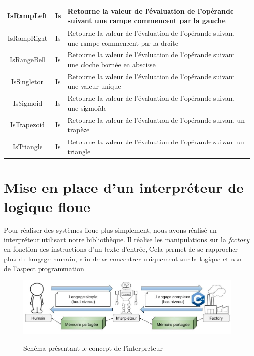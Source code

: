 \documentclass[a4paper,11pt]{article}
\begin{document}
\begin{table}[H]
\begin{center}
\begin{tabular}{|c|c|M{9cm}|}
                \hline
                IsRampLeft & Is & Retourne la valeur de l'évaluation de l'opérande suivant une rampe commencent par la gauche \tabularnewline
                \hline
                IsRampRight & Is & Retourne la valeur de l'évaluation de l'opérande suivant une rampe commencent par la droite \tabularnewline
                \hline
                IsRangeBell & Is & Retourne la valeur de l'évaluation de l'opérande suivant une cloche bornée en abscisse \tabularnewline
                \hline
                IsSingleton & Is & Retourne la valeur de l'évaluation de l'opérande suivant une valeur unique \tabularnewline
                \hline
                IsSigmoid & Is & Retourne la valeur de l'évaluation de l'opérande suivant une sigmoïde \tabularnewline
                \hline
                IsTrapezoid & Is & Retourne la valeur de l'évaluation de l'opérande suivant un trapèze \tabularnewline
                \hline
                IsTriangle & Is & Retourne la valeur de l'évaluation de l'opérande suivant un triangle \tabularnewline
                \hline
            \end{tabular}
        \end{center}
    \end{table}

    \newpage
    \section{Mise en place d'un interpréteur de logique floue}

    Pour réaliser des systèmes floue plus simplement, nous avons réalisé un interpréteur utilisant notre bibliothèque.
    Il réalise les manipulations sur la \textit{factory} en fonction des instructions d'un texte d'entrée,
    Cela permet de se rapprocher plus du langage humain, afin de se concentrer uniquement sur la logique et non de l'aspect programmation.

    \begin{figure}[H]
        \begin{center}
            \caption{Schéma présentant le concept de l'interpreteur}
            \includegraphics[scale=0.5]{assets/Interpreteur_Dessin.jpg}
            \label{fig:interpreterDessin}
        \end{center}
    \end{figure}
\end{document}
